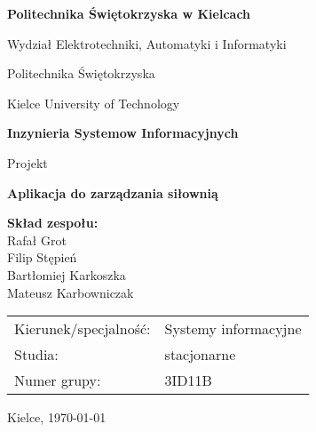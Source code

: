\documentclass[../../spr.tex]{subfiles}
\begin{document}
\begin{titlepage}
  \centering

  {\fontsize{16}{18}\selectfont \bfseries Politechnika Świętokrzyska w Kielcach}

  \vspace{0.5cm}
  Wydział Elektrotechniki, Automatyki i Informatyki

  \vspace{1.5cm}
  {\large Politechnika Świętokrzyska}

  \vspace{0.2cm}
  {\large Kielce University of Technology}

  \vfill

  {\LARGE \bfseries Inzynieria Systemow Informacyjnych}

  \vspace{1.5cm}
  {\Huge Projekt}

  \vfill

  {\Huge \bfseries Aplikacja do zarządzania siłownią}

  \vfill

  \begin{flushleft}
    \begin{minipage}{0.5\textwidth}
      \large
      \textbf{Skład zespołu:} \\
      Rafał Grot \\
      Filip Stępień \\
      Bartłomiej Karkoszka \\
      Mateusz Karbowniczak
    \end{minipage}

    \vspace{2cm}

    \begin{minipage}{0.8\textwidth}
      \large
      \begin{tabular}{p{5cm}p{5cm}}
        Kierunek/specjalność: & Systemy informacyjne \\
        Studia:               & stacjonarne          \\
        Numer grupy:          & 3ID11B
      \end{tabular}
    \end{minipage}
  \end{flushleft}

  \vspace{1cm}

  \large Kielce, \today
\end{titlepage}
\end{document}
